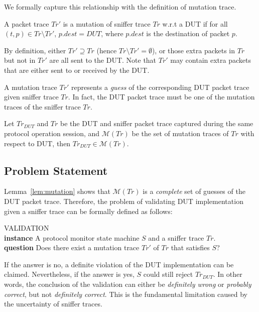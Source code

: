 We formally capture this relationship with the definition of mutation trace.

\begin{definition}
  \label{def:mutation}
  A packet trace $Tr'$ is a mutation of sniffer trace $Tr$ w.r.t a DUT if for
  all $(t, p) \in Tr \setminus Tr'$, $p.dest = DUT$, where $p.dest$ is the
  destination of packet $p$.
\end{definition}

By definition, either $Tr' \supseteq Tr$ (hence $Tr \setminus Tr' = \emptyset$),
or those extra packets in $Tr$ but not in $Tr'$ are all sent to the DUT. Note
that $Tr'$ may contain extra packets that are either sent to or received by
the DUT.

A mutation trace $Tr'$ represents a \textit{guess} of the corresponding DUT
packet trace given sniffer trace $Tr$.  In fact, the DUT packet trace must
be one of the mutation traces of the sniffer trace $Tr$.

\begin{lemma}
  Let $Tr_{DUT}$ and $Tr$ be the DUT and sniffer packet trace captured during
  the same protocol operation session, and $\mathcal{M}(Tr)$ be the set of
  mutation traces of $Tr$ with respect to DUT, then $Tr_{DUT} \in \mathcal{M}(Tr)$.
  \label{lem:mutation}
\end{lemma}%


\subsection{Problem Statement}
\label{subsec:problem}

Lemma~\ref{lem:mutation} shows that $\mathcal{M}(Tr)$ is a \textit{complete} set
of guesses of the DUT packet trace. Therefore, the problem of validating DUT
implementation given a sniffer trace can be formally defined as follows:

\begin{problem}
  \label{prob:validation}
  VALIDATION\\
  \textbf{instance} A protocol monitor state machine $S$ and a sniffer trace $Tr$.\\
  \textbf{question} Does there exist a mutation trace $Tr'$ of $Tr$ that satisfies $S$?
\end{problem}

If the answer is no, a definite violation of the DUT implementation can be
claimed. Nevertheless, if the answer is yes, $S$ could still reject $Tr_{DUT}$.
In other words, the conclusion of the validation can either be
\textit{definitely wrong} or \textit{probably correct}, but not
\textit{definitely correct}.  This is the fundamental limitation caused by the
uncertainty of sniffer traces.
